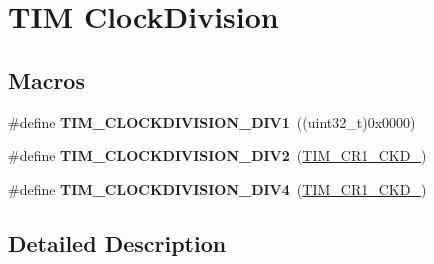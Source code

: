 \hypertarget{group___t_i_m___clock_division}{\section{T\-I\-M Clock\-Division}
\label{group___t_i_m___clock_division}
}
\subsection*{Macros}
\begin{DoxyCompactItemize}
\item 
\hypertarget{group___t_i_m___clock_division_ga309297ccd407a836ede6a42d4dc479c1}{\#define {\bfseries T\-I\-M\-\_\-\-C\-L\-O\-C\-K\-D\-I\-V\-I\-S\-I\-O\-N\-\_\-\-D\-I\-V1}~((uint32\-\_\-t)0x0000)}\label{group___t_i_m___clock_division_ga309297ccd407a836ede6a42d4dc479c1}

\item 
\hypertarget{group___t_i_m___clock_division_gaf84a16da8edb80a3d8af91fbfc046181}{\#define {\bfseries T\-I\-M\-\_\-\-C\-L\-O\-C\-K\-D\-I\-V\-I\-S\-I\-O\-N\-\_\-\-D\-I\-V2}~(\hyperlink{group___peripheral___registers___bits___definition_ga458d536d82aa3db7d227b0f00b36808f}{T\-I\-M\-\_\-\-C\-R1\-\_\-\-C\-K\-D\-\_})}\label{group___t_i_m___clock_division_gaf84a16da8edb80a3d8af91fbfc046181}

\item 
\hypertarget{group___t_i_m___clock_division_ga7cac7491610ffc135ea9ed54f769ddbc}{\#define {\bfseries T\-I\-M\-\_\-\-C\-L\-O\-C\-K\-D\-I\-V\-I\-S\-I\-O\-N\-\_\-\-D\-I\-V4}~(\hyperlink{group___peripheral___registers___bits___definition_ga7ff2d6c2c350e8b719a8ad49c9a6bcbe}{T\-I\-M\-\_\-\-C\-R1\-\_\-\-C\-K\-D\-\_})}\label{group___t_i_m___clock_division_ga7cac7491610ffc135ea9ed54f769ddbc}

\end{DoxyCompactItemize}


\subsection{Detailed Description}
